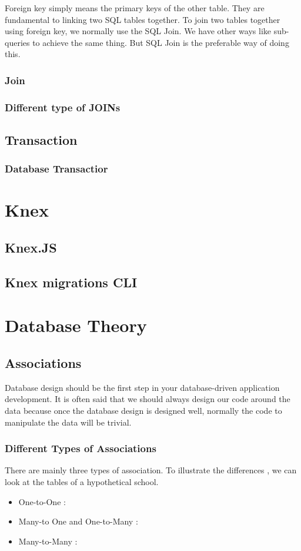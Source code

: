 \documentclass[a4paper]{article}
\begin{document}
Foreign key simply means the primary keys of the other table. They are fundamental to linking two SQL tables together. To join two tables together using foreign key, we normally use the SQL Join. We have other ways like sub-queries to achieve the same thing. But SQL Join is the preferable way of doing this.
\subsubsection{Join}
\subsubsection{Different type of JOINs}
\begin{eg}

\end{eg}
\subsection{Transaction}
\subsubsection{Database Transactior}


\section{Knex}
\subsection{Knex.JS}

\subsection{Knex migrations CLI}

\section{Database Theory}
\subsection{Associations}
Database design should be the first step in your database-driven application development. It is often said that we should always design our code around the data because once the database design is designed well, normally the code to manipulate the data will be trivial.
\subsubsection{Different Types of Associations}
There are mainly three types of association. To illustrate the differences , we can look at the tables of a hypothetical school.\\
\begin{itemize}
\item One-to-One : 
\item Many-to One and One-to-Many : 
\item Many-to-Many : 
\end{itemize}
\end{document}
